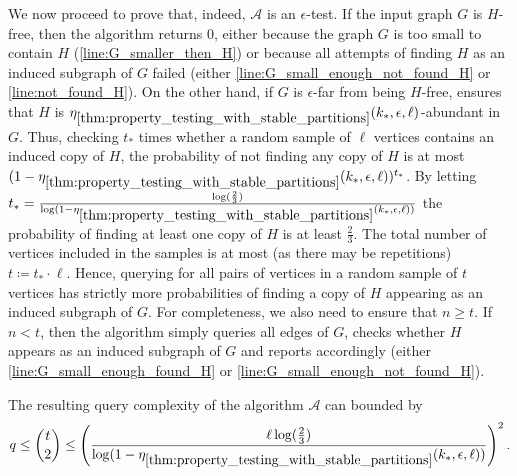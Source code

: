         We now proceed to prove that, indeed, $\mathcal{A}$ is an $\epsilon$-test.
        If the input graph $G$ is $H$-free, then the algorithm returns $0$, either because the graph $G$ is too small to
        contain $H$ (\cref{line:G_smaller_then_H}) or because all attempts of finding $H$ as an induced subgraph of $G$
        failed (either \cref{line:G_small_enough_not_found_H} or \cref{line:not_found_H}).
        On the other hand, if $G$ is $\epsilon$-far from being $H$-free, 
        ensures that $H$ is $\eta_{\ref{thm:property_testing_with_stable_partitions}}(k_*, \epsilon, \ell)$-abundant in $G$.
        Thus, checking $t_*$ times whether a random sample of $\ell$ vertices contains an
        induced copy of $H$, the probability of not finding any copy of $H$ is at most
        $( 1 - \eta_{\ref{thm:property_testing_with_stable_partitions}}(k_*, \epsilon, \ell) )^{t_*}$.
        By letting $t_* = \frac{\log( \frac{2}{3} )}
            {\log( 1 - \eta_{\ref{thm:property_testing_with_stable_partitions}}(k_*, \epsilon, \ell) )}$
        the probability of finding at least one copy of $H$ is at least $\frac{2}{3}$.
        The total number of vertices included in the samples is at most (as there may be repetitions) $t \coloneqq t_* \cdot \ell$.
        Hence, querying for all pairs of vertices in a random sample of $t$ vertices has strictly more probabilities of
        finding a copy of $H$ appearing as an induced subgraph of $G$.
        For completeness, we also need to ensure that $n \geq t$.
        If $n < t$, then the algorithm simply queries all edges of $G$, checks whether $H$ appears as an induced subgraph
        of $G$ and reports accordingly (either \cref{line:G_small_enough_found_H} or \cref{line:G_small_enough_not_found_H}).

        The resulting query complexity of the algorithm $\mathcal{A}$ can bounded by
        \[
            q \leq {t \choose 2}
              \leq \left(  \frac{\ell \log( \frac{2}{3} )}
                   {\log( 1 - \eta_{\ref{thm:property_testing_with_stable_partitions}}(k_*, \epsilon, \ell) )} \right)^2.
        \]


